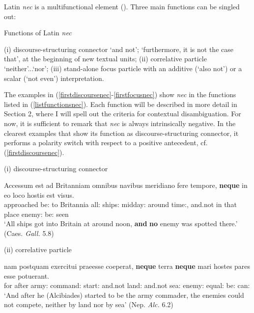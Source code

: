 \documentclass[output=paper,modfonts,nonflat,citecolor=brown,
showindex
]{langsci/langscibook}
\begin{document}
Latin {\em{nec}} is a multifunctional element (\citealt[]{Orlandini01, OrlandiniPoccetti07}). Three main functions can be singled out: 

{\begin{exe}
\ex \label{listfunctionsnec} Functions of Latin {\em{nec}}
\begin{xlist}
\ex (i) discourse-structuring connector `and not'; `furthermore, it is not the case that', at the beginning of new textual units;
\ex (ii) correlative particle `neither'...`nor';
\ex (iii) stand-alone focus particle with an additive (`also not') or a scalar (`not even') interpretation. 
\end{xlist}
\end{exe}}

\noindent The examples in (\ref{firstdiscoursenec}-\ref{firstfocusnec}) show {\em{nec}} in the functions listed in (\ref{listfunctionsnec}). Each function will be described in more detail in Section 2, where I will spell out the criteria for contextual disambiguation. For now, it is sufficient to remark that {\em{nec}} is always intrinsically negative. In the clearest examples that show its function as discourse-structuring connector, it performs a polarity switch with respect to a positive antecedent, cf. (\ref{firstdiscoursenec}).

{\begin{exe}
\ex (i) discourse-structuring connector 

\label{firstdiscoursenec} \gll Accessum est ad Britanniam omnibus navibus meridiano fere tempore, {\bf{neque}} in eo loco hostis est visus.\\
approached be:{} to Britannia all:{} ships:{} midday:{} around time:{}, and.not in that place enemy:{} be:{} seen\\

`All ships got into Britain at around noon, {\bf{and}} {\bf{no}} enemy was spotted there.' (Caes.{\em{ Gall.}} 5.8)

\end{exe}}

{\begin{exe}
\ex (ii) correlative particle 

\label{firstcorrelativenec} \gll nam postquam exercitui praeesse coeperat, {\bf{neque}} terra {\bf{neque}} mari hostes pares esse potuerant.\\
for after army:{} command:{} start:{} and.not land:{} and.not sea:{} enemy:{} equal:{} be:{} can:{}\\

`And after he (Alcibiades) started to be the army commader, the enemies could not compete, neither by land nor by sea'
(Nep. {\em{Alc.}} 6.2)
\end{exe}}
\end{document}
